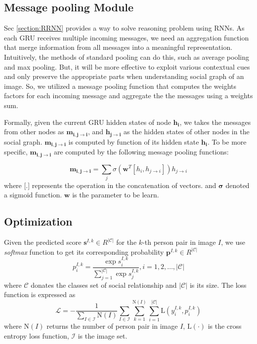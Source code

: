 \documentclass{article}
\begin{document}
\subsection{Message pooling Module} \label{section:mp}

Sec \ref{section:RRNN} provides a way to solve reasoning problem using RNNs. As each GRU receives multiple incoming messages, we need an aggregation function that merge information from all messages into a meaningful representation. Intuitively, the methods of standard pooling  can do this, such as average pooling and max pooling. But, it will be more effective to exploit various contextual cues and only preserve the appropriate parts when understanding social graph of an image. So, we utilized a message pooling function that computes the weights factors for each incoming message and aggregate the the messages using a weights sum.

Formally, given the current GRU hidden states of node $\bm{h_i}$, we takes the messages from other nodes as $\bm{m_{i,j \to i}}$, and $\bm{h_{j \to i}}$ as the hidden states of other nodes in the social graph. $\bm{m_{i,j \to i}}$ is computed by function of its hidden state $\bm{h_i}$. To be more specific, $\bm{m_{i, j \to i}}$ are computed by the following message pooling functions:

\begin{equation}
	\bm{m_{i,j \to i}} = \sum_{j} \sigma{(\bm{w}^T[h_i,h_{j \to i}])h_{j \to i}}	
\end{equation}
where [.] represents the operation in the concatenation of vectors. and $\bm{\sigma}$ denoted a sigmoid function. $\bm{w}$ is the parameter to be learn.

\subsection{Optimization}

Given the predicted score $\mathbf{s}^{I,k} \in R^{|\mathcal{C}|}$ for the $k$-th person pair in image $I$, we use {\it softmax} function to get its corresponding probability $\mathbf{p}^{I,k} \in R^{|\mathcal{C}|}$
\begin{equation}
  \label{eq:prob_eq}
  p_i^{I,k} = \frac{\exp{s_i^{I,k}}}{\sum_{j=1}^{|\mathcal{C}|}{\exp{s_j^{I,k}}}}, i=1,2,\dots,|\mathcal{C}|
\end{equation}
where $\mathcal{C}$ donates the classes set of social relationship and $|\mathcal{C}|$ is its size. The loss function is expressed as
\begin{equation}
  \label{eq:loss_eq}
  \mathcal{L} = - \frac{1}{\sum_{I \in \mathcal{I}}\text{N}(I)} \sum_{I \in \mathcal{I}} \sum_{k=1}^{\text{N}(I)} \sum_{i=1}^{|\mathcal{C}|} \text{L}(y_{i}^{I,k}, p_{i}^{I,k})
\end{equation}
where $\text{N}(I)$ returns the number of person pair in image $I$, $\text{L}(\cdot)$ is the cross entropy loss function, $\mathcal{I}$ is the image set.
\end{document}
